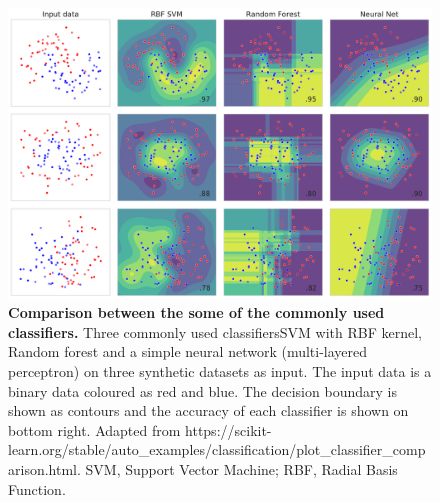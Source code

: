 \begin{figure}[!hbtp]
\centerline{\includegraphics[width=1\textwidth]{chapters/Introduction/Figures/classifier_comparision.pdf}}
\caption[Comparison between some of the commonly used classifiers.]{{\bf Comparison between the some of the commonly used classifiers.} Three commonly used classifiers\textemdash SVM with RBF kernel, Random forest and a simple neural network (multi-layered perceptron) on three synthetic datasets as input. The input data is a binary data coloured as red and blue. The decision boundary is shown as contours and the accuracy of each classifier is shown on bottom right. Adapted from https://scikit-learn.org/stable/auto\_examples/classification/plot\_classifier\_comparison.html. SVM, Support Vector Machine; RBF, Radial Basis Function.}\label{fig:classifier_comparision}
\end{figure}
